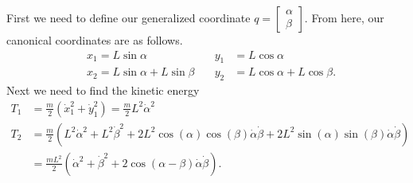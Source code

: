 \begin{solution}[8.1]
First we need to define our generalized coordinate $q = \begin{bmatrix} \alpha \\ \beta \end{bmatrix}$. From here, our canonical coordinates are as follows.
\begin{align}
&	x_1 = L \sin \alpha \quad  &y_1 &= L \cos \alpha \\
&	x_2 = L \sin \alpha + L \sin \beta  \quad &y_2 &= L \cos \alpha + L \cos \beta. 
\end{align}
Next we need to find the kinetic energy
\begin{align}
	T_1 &= \frac{m}{2}(\dot{x}_1^{2} + \dot{y}_1^2)= \frac{m}{2} L^2 \dot{\alpha }^2 \\
	T_2 &= \frac{m}{2}(L^2 \dot{\alpha }^2 + L^2 \dot{\beta }^2 + 2L^2\cos (\alpha ) \cos (\beta ) \dot{\alpha }\dot{\beta } + 2L^2 \sin(\alpha ) \sin(\beta ) \dot{\alpha } \dot{\beta } )\\
	    &= \frac{mL^2}{2} ( \dot{\alpha }^2 + \dot{\beta }^2 + 2 \cos(\alpha - \beta) \dot{\alpha }\dot{\beta }).
\end{align}


\end{solution}
